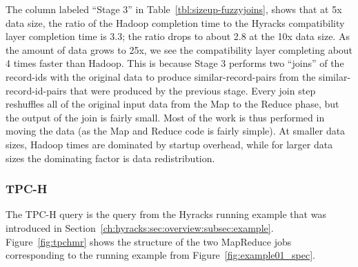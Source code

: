 The column labeled ``Stage 3'' in Table~\ref{tbl:sizeup-fuzzyjoins}, shows that at 5x data size, the ratio of the Hadoop completion time to the Hyracks compatibility
layer completion time is 3.3; the ratio drops to about 2.8 at the 10x
data size. As the amount of data grows to 25x, we see the compatibility layer completing about 4 times faster than Hadoop.
This is because Stage 3 performs two ``joins'' of the record-ids with the original data to produce similar-record-pairs from the similar-record-id-pairs that were produced by
the previous
stage. Every join step reshuffles all of the original input data from the Map to the Reduce phase, but the output of the join is fairly small. Most of the work is thus
performed in moving the data (as the Map and Reduce code is fairly simple). At smaller data sizes, Hadoop times are dominated by startup overhead, while for larger data
sizes the dominating factor is data redistribution. 

\subsubsection{TPC-H}

The TPC-H query is the query from the Hyracks running example that was introduced in Section~\ref{ch:hyracks:sec:overview:subsec:example}. Figure~\ref{fig:tpchmr} shows the structure of the two
MapReduce jobs corresponding to the running example from Figure~\ref{fig:example01_spec}.

